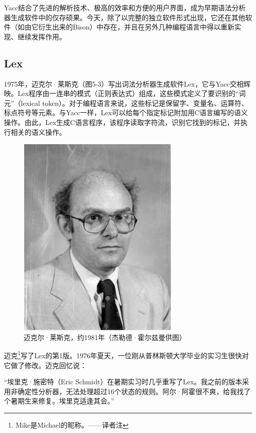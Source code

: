 \documentclass[a4paper,12pt,UTF8,twoside]{ctexbook}
\begin{document}
Yacc结合了先进的解析技术、极高的效率和方便的用户界面，成为早期语法分析器生成软件中的仅存硕果。今天，除了以完整的独立软件形式出现，它还在其他软件（如由它衍生出来的Bison）中存在，并且在另外几种编程语言中得以重新实现、继续发挥作用。

\subsection{Lex}

1975年，迈克尔·莱斯克（图5-3）写出词法分析器生成软件Lex，它与Yacc交相辉映。Lex程序由一连串的模式（正则表达式）组成，这些模式定义了要识别的“词元”（lexical token）。对于编程语言来说，这些标记是保留字、变量名、运算符、标点符号等元素。与Yacc一样，Lex可以给每个指定标记附加用C语言编写的语义操作。由此，Lex生成C语言程序，该程序读取字符流，识别它找到的标记，并执行相关的语义操作。

\begin{figure}[htbp]
	\centering
	\includegraphics[width=0.7\linewidth]{42}
	\caption{迈克尔·莱斯克，约1981年（杰勒德·霍尔兹曼供图）}
	\label{fig:1}
\end{figure}

迈克\footnote{Mike是Michael的昵称。——译者注}写了Lex的第1版。1976年夏天，一位刚从普林斯顿大学毕业的实习生很快对它做了修改。迈克回忆说：

“埃里克·施密特（Eric Schmidt）在暑期实习时几乎重写了Lex。我之前的版本采用非确定性分析器，无法处理超过16个状态的规则。阿尔·阿霍很不爽，给我找了个暑期生来修复。埃里克适逢其会。”
\end{document}
